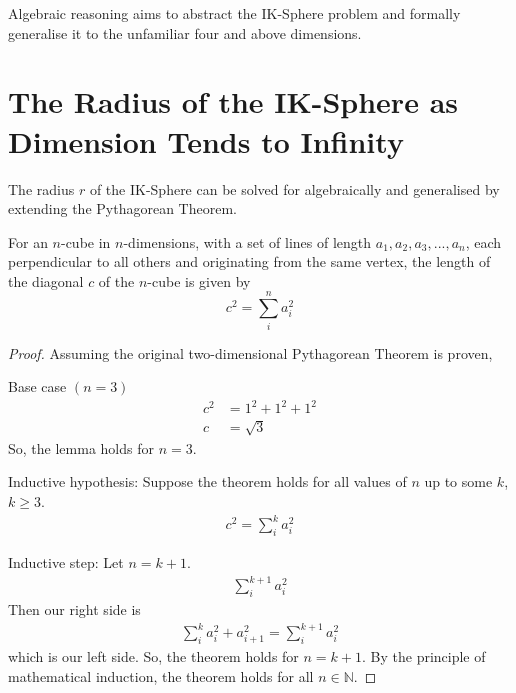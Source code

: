 \noindent Algebraic reasoning aims to abstract the IK-Sphere problem and formally generalise it to the unfamiliar four and above dimensions.

\section{The Radius of the IK-Sphere as Dimension Tends to Infinity}
The radius $r$ of the IK-Sphere can be solved for algebraically and generalised by extending the Pythagorean Theorem.
\begin{lemma}
    For an $n$-cube in $n$-dimensions, with a set of lines of length $a_1, a_2, a_3, ... , a_n$, each perpendicular to all others and originating from the same vertex, the length of the diagonal $c$ of the $n$-cube is given by
    \begin{equation}\label{extendedpythag}
        c^2 = \sum_{i}^{n}a_i^2
    \end{equation}
\end{lemma}
\begin{proof}

    Assuming the original two-dimensional Pythagorean Theorem is proven,
    
    \noindent 
    Base case $\left(n=3\right)$
    \begin{equation*}
        \begin{split}
            c^2&=1^2+1^2+1^2\\
            c&=\sqrt{3}
        \end{split}
    \end{equation*}
    So, the lemma holds for $n=3$.
    
    \noindent Inductive hypothesis: Suppose the theorem holds for all values of $n$ up to some $k$, $k \geq 3$.
    \begin{equation*}
        \begin{split}
            c^2=\sum_{i}^{k}a_i^2
        \end{split}
    \end{equation*}
    
    \noindent Inductive step: Let $n=k+1$. 
    \begin{equation*}
        \begin{split}
        \sum_{i}^{k+1}a^2_{i}
        \end{split}
    \end{equation*}
    Then our right side is
    \begin{equation*}
        \begin{split}
        \sum_{i}^{k}a_i^2+a_{i+1}^2=\sum_{i}^{k+1}a^2_{i}
        \end{split}
    \end{equation*}
    which is our left side. So, the theorem holds for $n=k+1$. 
    By the principle of mathematical induction, the theorem holds for all $n \in \mathbb{N}$.
\end{proof}
